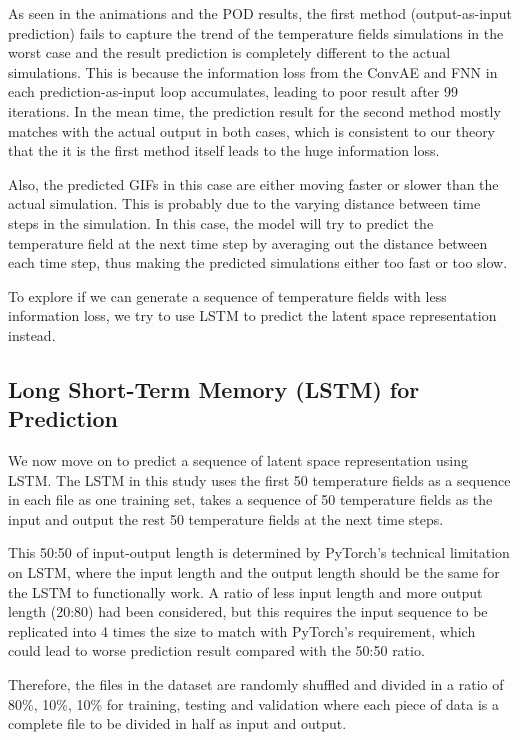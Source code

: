 As seen in the animations and the POD results, the first method (output-as-input prediction) fails to capture the trend of the temperature fields simulations in the worst case and the result prediction is completely different to the actual simulations. This is because the information loss from the ConvAE and FNN in each prediction-as-input loop accumulates, leading to poor result after 99 iterations. In the mean time, the prediction result for the second method mostly matches with the actual output in both cases, which is consistent to our theory that the it is the first method itself leads to the huge information loss.

Also, the predicted GIFs in this case are either moving faster or slower than the actual simulation. This is probably due to the varying distance between time steps in the simulation. In this case, the model will try to predict the temperature field at the next time step by averaging out the distance between each time step, thus making the predicted simulations either too fast or too slow.

To explore if we can generate a sequence of temperature fields with less information loss, we try to use LSTM to predict the latent space representation instead.


\subsection{Long Short-Term Memory (LSTM) for Prediction}

We now move on to predict a sequence of latent space representation using LSTM. The LSTM in this study uses the first 50 temperature fields as a sequence in each file as one training set, takes a sequence of 50 temperature fields as the input and output the rest 50 temperature fields at the next time steps.

This 50:50 of input-output length is determined by PyTorch's technical limitation on LSTM, where the input length and the output length should be the same for the LSTM to functionally work. A ratio of less input length and more output length (20:80) had been considered, but this requires the input sequence to be replicated into 4 times the size to match with PyTorch's requirement, which could lead to worse prediction result compared with the 50:50 ratio.

Therefore, the files in the dataset are randomly shuffled and divided in a ratio of 80\%, 10\%, 10\% for training, testing and validation where each piece of data is a complete file to be divided in half as input and output.

